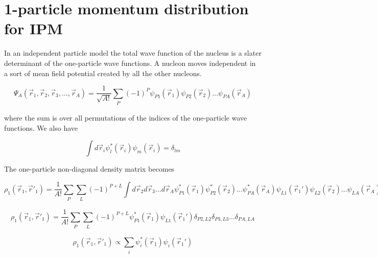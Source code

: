 \documentclass[12pt]{article}
\begin{document}
\section{1-particle momentum distribution for IPM}

In an independent particle model the total wave function of the nucleus is a slater determinant of the one-particle wave functions. A nucleon moves independent in a sort of mean field potential created by all the other nucleons. 

\begin{equation}
\Psi_A(\vec{r}_1,\vec{r}_2,\vec{r}_3, ... ,\vec{r}_A)= \frac{1}{\sqrt{A!}} \sum_{\substack{P}} 
													  (-1)^P \psi_{P1}(\vec{r}_1)
													         \psi_{P2}(\vec{r}_2)...
													         \psi_{PA}(\vec{r}_A)
\end{equation}

where the sum is over all permutations of the indices of the one-particle wave functions. We also have 

\begin{equation}
\int d\vec{r}_i \psi^*_l(\vec{r}_i)\psi_m(\vec{r}_i) = \delta_{lm}
\end{equation}

The one-particle non-diagonal density matrix becomes

\begin{equation}
\rho_1(\vec{r}_1,\vec{r}'_1)  = \frac{1}{A!} 	 \sum_{\substack{P}} \sum_{\substack{L}} (-1)^{P+L} \int d\vec{r}_2 d\vec{r}_3 ... d\vec{r}_A 
\psi^*_{P1}(\vec{r}_1)\psi^*_{P2}(\vec{r}_2)...\psi^*_{PA}(\vec{r}_A)
\psi_{L1}(\vec{r}_1')\psi_{L2}(\vec{r}_2)...\psi_{LA}(\vec{r}_A)
\end{equation}

\begin{equation}
\rho_1(\vec{r}_1,\vec{r}'_1)  = \frac{1}{A!} 	 \sum_{\substack{P}} \sum_{\substack{L}} (-1)^{P+L} \psi^*_{P1}(\vec{r}_1) \psi_{L1}(\vec{r}_1') 
\delta_{P2,L2}\delta_{P3,L3}...\delta_{PA,LA} 
\end{equation}

\begin{equation}
\rho_1(\vec{r}_1,\vec{r}'_1)  \propto \sum_{\substack{i}} \psi^*_i(\vec{r}_1) \psi_i(\vec{r}_1')
\end{equation}
\end{document}
